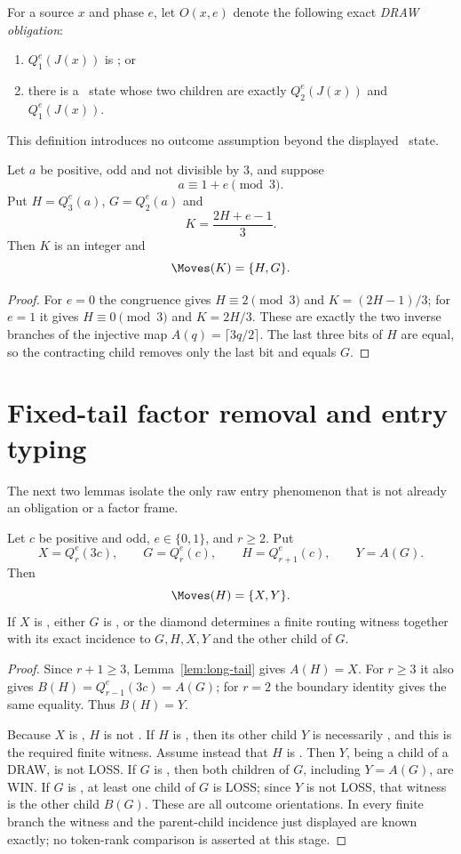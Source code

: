 For a source $x$ and phase $e$, let $O(x,e)$ denote the following exact
\emph{DRAW obligation}:
\begin{enumerate}[label=(\alph*)]
\item $Q_1^e(J(x))$ is \DRAW; or
\item there is a \DRAW\ state whose two children are exactly
      $Q_2^e(J(x))$ and $Q_1^e(J(x))$.
\end{enumerate}
This definition introduces no outcome assumption beyond the displayed
\DRAW\ state.

\begin{lemma}\label{lem:hidden-parent}
Let $a$ be positive, odd and not divisible by $3$, and suppose
\[
  a\equiv1+e\pmod3.
\]
Put $H=Q_3^e(a)$, $G=Q_2^e(a)$ and
\[
  K=\frac{2H+e-1}{3}.
\]
Then $K$ is an integer and
\[
  \Moves(K)=\{H,G\}.
\]
\end{lemma}

\begin{proof}
For $e=0$ the congruence gives $H\equiv2\pmod3$ and
$K=(2H-1)/3$; for $e=1$ it gives $H\equiv0\pmod3$ and $K=2H/3$.
These are exactly the two inverse branches of the injective map
$A(q)=\lceil3q/2\rceil$. The last three bits of $H$ are equal, so the
contracting child removes only the last bit and equals $G$.
\end{proof}

\section{Fixed-tail factor removal and entry typing}

The next two lemmas isolate the only raw entry phenomenon that is not already
an obligation or a factor frame.

\begin{lemma}\label{lem:fixed-tail-factor}
Let $c$ be positive and odd, $e\in\{0,1\}$, and $r\ge2$. Put
\[
  X=Q_r^e(3c),\qquad G=Q_r^e(c),\qquad H=Q_{r+1}^e(c),\qquad Y=A(G).
\]
Then
\[
  \Moves(H)=\{X,Y\}.
\]
If $X$ is \DRAW, either $G$ is \DRAW, or the diamond determines a finite
routing witness together with its exact incidence to $G,H,X,Y$ and the other
child of $G$.
\end{lemma}

\begin{proof}
Since $r+1\ge3$, Lemma~\ref{lem:long-tail} gives $A(H)=X$. For $r\ge3$ it
also gives $B(H)=Q_{r-1}^e(3c)=A(G)$; for $r=2$ the boundary identity gives
the same equality. Thus $B(H)=Y$.

Because $X$ is \DRAW, $H$ is not \LOSS. If $H$ is \WIN, then its other
child $Y$ is necessarily \LOSS, and this is the required finite witness.
Assume instead that $H$ is \DRAW. Then $Y$, being a child of a DRAW, is not
LOSS. If $G$ is \LOSS, then both children of $G$, including $Y=A(G)$, are
WIN. If $G$ is \WIN, at least one child of $G$ is LOSS; since $Y$ is not LOSS,
that witness is the other child $B(G)$. These are all outcome orientations.
In every finite branch the witness and the parent-child incidence just
displayed are known exactly; no token-rank comparison is asserted at this
stage.
\end{proof}

